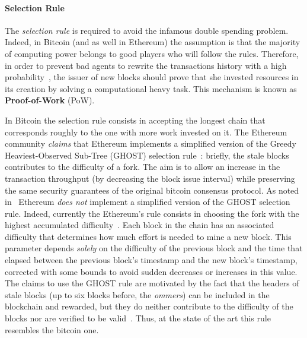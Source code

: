 \paragraph{Selection Rule}
The \emph{selection rule} is required to avoid the infamous double spending
problem. Indeed, in Bitcoin (and as well in Ethereum) the assumption is that the
majority of computing power belongs to good players who will follow the rules.
Therefore, in order to prevent bad agents to rewrite the transactions history
with a high probability~\cite{bib:bitcoin}, the issuer of new blocks should
prove that she invested resources in its creation by solving a computational
heavy task. This mechanism is known as \textbf{Proof-of-Work} (PoW).



In Bitcoin
the selection rule consists in accepting the longest chain that corresponds
roughly to the one with more work invested on it.
The Ethereum
community \emph{claims} that Ethereum implements a simplified version of the
Greedy Heaviest-Observed Sub-Tree (GHOST) selection
rule~\cite{wood2018ethereum}:
briefly, the stale blocks contributes to the difficulty of a fork.
The aim is to allow an increase in the transaction throughput (by decreasing
the block issue interval) while preserving the same security guarantees of the
original bitcoin consensus protocol.
As noted in~\cite{bib:securityAndScalabilityPoW} Ethereum \emph{does not}
implement a simplified version of the GHOST selection rule.
Indeed,
currently the Ethereum's rule consists in choosing the fork with the
highest accumulated difficulty~\cite{wood2018ethereum}.
Each block in the chain has an
associated difficulty that determines how much effort is needed to mine a new
block. This parameter depends \emph{solely} on the difficulty of the previous
block and the time that elapsed between the previous block's timestamp and the
new block's timestamp, corrected with some bounds to avoid sudden decreases or
increases in this value. The claims to use the GHOST rule are motivated by the
fact that the headers of stale blocks (up to six blocks before, the
\emph{ommers}) can be included in the blockchain and rewarded, but they do
neither contribute to the difficulty of the blocks nor are verified to be
valid~\cite{bib:securityAndScalabilityPoW}. Thus, at the state of the art
this rule resembles the bitcoin one.





